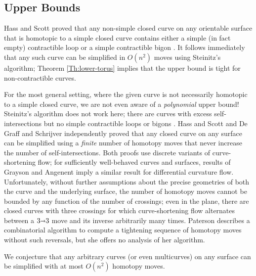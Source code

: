 \documentclass[11pt,twoside]{article}
\def\arcto{\mathord\shortrightarrow}
\def\arc#1#2{#1\arcto#2}
\numberwithin{figure}{section}
\begin{document}
\subsection{Upper Bounds}

Hass and Scott proved that any non-simple closed curve on any orientable surface that is homotopic to a simple closed curve contains either a simple (in fact empty) contractible loop or a simple contractible bigon \cite[Theorem 1]{hs-ics-85}. It follows immediately that any such curve can be simplified in $O(n^2)$ moves using Steinitz's algorithm; Theorem \ref{Th:lower-torus} implies that the upper bound is tight for non-contractible curves.

For the most general setting, where the given curve is not necessarily homotopic to a simple closed curve, we are not even aware of a \emph{polynomial} upper bound!  Steinitz's algorithm does not work here; there are curves with excess self-intersections but no simple contractible loops or bigons \cite{hs-ics-85}. Hass and Scott \cite{hs-scs-94} and De Graff and Schrijver \cite{gs-mcmcr-97} independently proved that any closed curve on any surface can be simplified using a \emph{finite} number of homotopy moves that never increase the number of self-intersections. Both proofs use discrete variants of curve-shortening flow; for sufficiently well-behaved curves and surfaces, results of Grayson \cite{g-sec-89} and Angenent \cite{a-pecs2-91} imply a similar result for differential curvature flow. Unfortunately, without further assumptions about the precise geometries of both the curve and the underlying surface, the number of homotopy moves cannot be bounded by any function of the number of crossings; even in the plane, there are closed curves with three crossings for which curve-shortening flow alternates between a $\arc33$ move and its inverse arbitrarily many times. Paterson \cite{p-cails-02} describes a combinatorial algorithm to compute a tightening sequence of homotopy moves without such reversals, but she offers no analysis of her algorithm.

We conjecture that any arbitrary curves (or even multicurves) on any surface can be simplified with at most $O(n^2)$ homotopy moves.
\end{document}
